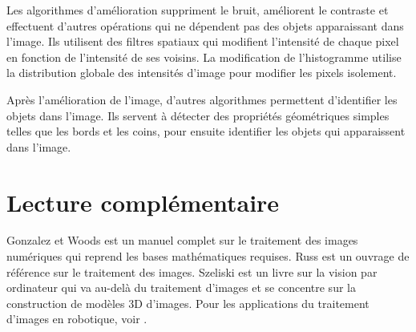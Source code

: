 Les algorithmes d'amélioration suppriment le bruit, améliorent le contraste et effectuent d'autres opérations qui ne dépendent pas des objets apparaissant dans l'image. Ils utilisent des filtres spatiaux qui modifient l'intensité de chaque pixel en fonction de l'intensité de ses voisins. La modification de l'histogramme utilise la distribution globale des intensités d'image pour modifier les pixels isolement.

Après l'amélioration de l'image, d'autres algorithmes permettent d'identifier les objets dans l'image. Ils servent à détecter des propriétés géométriques simples telles que les bords et les coins, pour ensuite identifier les objets qui apparaissent dans l'image.

\section{Lecture complémentaire}

Gonzalez et Woods \cite{GW} est un manuel complet sur le traitement des images numériques qui reprend les bases mathématiques requises. Russ \cite{russ} est un ouvrage de référence sur le traitement des images. Szeliski \cite{szeliski} est un livre sur la vision par ordinateur qui va au-delà du traitement d'images et se concentre sur la construction de modèles 3D d'images. Pour les applications du traitement d'images en robotique, voir \cite[Chapter~4]{siegwart}.
